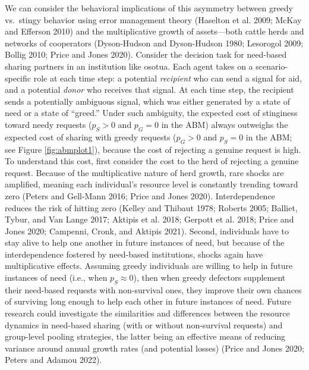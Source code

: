 \documentclass[
]{article}
\begin{document}
We can consider the behavioral implications of this asymmetry between greedy vs.~stingy behavior using error management theory (Haselton et al. 2009; McKay and Efferson 2010) and the multiplicative growth of assets---both cattle herds and networks of cooperators (Dyson-Hudson and Dyson-Hudson 1980; Lesorogol 2009; Bollig 2010; Price and Jones 2020). Consider the decision task for need-based sharing partners in an institution like osotua. Each agent takes on a scenario-specific role at each time step: a potential \emph{recipient} who can send a signal for aid, and a potential \emph{donor} who receives that signal. At each time step, the recipient sends a potentially ambiguous signal, which was either generated by a state of need or a state of ``greed.'' Under such ambiguity, the expected cost of stinginess toward needy requests (\(p_S >0\) and \(p_G=0\) in the ABM) always outweighs the expected cost of sharing with greedy requests (\(p_G>0\) and \(p_S=0\) in the ABM; see Figure \ref{fig:abmplot1}), because the cost of rejecting a genuine request is high. To understand this cost, first consider the cost to the herd of rejecting a genuine request. Because of the multiplicative nature of herd growth, rare shocks are amplified, meaning each individual's resource level is constantly trending toward zero (Peters and Gell-Mann 2016; Price and Jones 2020). Interdependence reduces the risk of hitting zero (Kelley and Thibaut 1978; Roberts 2005; Balliet, Tybur, and Van Lange 2017; Aktipis et al. 2018; Gerpott et al. 2018; Price and Jones 2020; Campenni, Cronk, and Aktipis 2021). Second, individuals have to stay alive to help one another in future instances of need, but because of the interdependence fostered by need-based institutions, shocks again have multiplicative effects. Assuming greedy individuals are willing to help in future instances of need (i.e., when \(p_S \approx 0\)), then when greedy defectors supplement their need-based requests with non-survival ones, they improve their own chances of surviving long enough to help each other in future instances of need. Future research could investigate the similarities and differences between the resource dynamics in need-based sharing (with or without non-survival requests) and group-level pooling strategies, the latter being an effective means of reducing variance around annual growth rates (and potential losses) (Price and Jones 2020; Peters and Adamou 2022).
\end{document}
